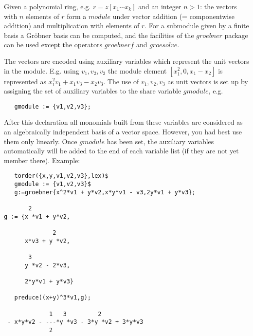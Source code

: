 Given a polynomial ring, e.g. $r=z[x_1 \cdots x_k]$ and
an integer $n>1$: the vectors with $n$ elements of $r$
form a $module$ under vector addition (= componentwise addition)
and multiplication with elements of $r$. For a submodule
given by a finite basis a Gr\"obner basis
can be computed, and the facilities of the $groebner$ package
can be used except the operators $groebnerf$ and $groesolve$.

The vectors are encoded using auxiliary variables which represent
the unit vectors in the module. E.g. using ${v_1,v_2,v_3}$ the
module element $[x_1^2,0,x_1-x_2]$ is represented as
$x_1^2 v_1 + x_1 v_3 - x_2 v_3$. The use of ${v_1,v_2,v_3}$
as unit vectors is set up by assigning the set of auxiliary variables
to the share variable $gmodule$, e.g.
\begin{verbatim}
   gmodule := {v1,v2,v3};
\end{verbatim}
After this declaration all monomials built from these variables
are considered as an algebraically independent basis of a vector
space. However, you had best use them only linearly. Once $gmodule$
has been set, the auxiliary variables automatically will be
added to the end of each variable list (if they are not yet
member there).
Example:
\begin{verbatim}
   torder({x,y,v1,v2,v3},lex)$
   gmodule := {v1,v2,v3}$
   g:=groebner{x^2*v1 + y*v2,x*y*v1 - v3,2y*v1 + y*v3};

       2
g := {x *v1 + y*v2,

              2
      x*v3 + y *v2,

       3
      y *v2 - 2*v3,

      2*y*v1 + y*v3}

   preduce((x+y)^3*v1,g);

             1   3         2
 - x*y*v2 - ---*y *v3 - 3*y *v2 + 3*y*v3
             2

\end{verbatim}

